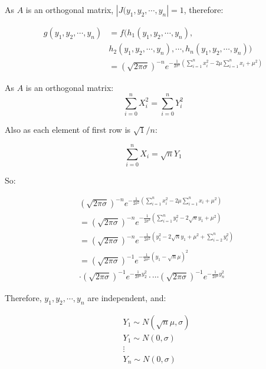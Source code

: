 \documentclass{article}
\begin{document}
As \(A\) is an orthogonal matrix, \(|J(y_1,y_2,\cdots,y_n|=1\), therefore:

\begin{equation}
\begin{split}
g(y_1,y_2,\cdots,y_n)&=f(h_1(y_1,y_2,\cdots,y_n),\\
    &h_2(y_1,y_2,\cdots,y_n),\cdots,h_n(y_1,y_2,\cdots,y_n))\\
    &=(\sqrt{2\pi\sigma})^{-n}e^{-\frac{1}{2\sigma^2}(\sum_
    {i=1}^nx_i^2-2\mu\sum_{i=1}^nx_i+\mu^2)}
\end{split}
\end{equation}

As \(A\) is an orthogonal matrix:
\begin{equation}
    \sum_{i=0}^nX_i^2=\sum_{i=0}^nY_i^2
\end{equation}

Also as each element of first row is \(\sqrt{1}/{n}\):

\begin{equation}
    \sum_{i=0}^nX_i = \sqrt{n}{Y_1}
\end{equation}

So:

\begin{equation}
    \begin{split}
    &(\sqrt{2\pi\sigma})^{-n}e^{-\frac{1}{2\sigma^2}(\sum_
        {i=1}^nx_i^2-2\mu\sum_{i=1}^nx_i+\mu^2)}\\
    &=(\sqrt{2\pi\sigma})^{-n}e^{-\frac{1}{2\sigma^2}(
        \sum_{i=1}^ny_i^2-2\sqrt{n}y_1+\mu^2)}\\
    &=(\sqrt{2\pi\sigma})^{-n}e^{-\frac{1}{2\sigma^2}
    (y_1^2-2\sqrt{n}y_1+\mu^2+\sum_{i=2}^ny_i^2)}\\
    &=(\sqrt{2\pi\sigma})^{-1}e^{-\frac{1}{2\sigma^2}(y_1-\sqrt{n}\mu)^2}\\
    &\cdot(\sqrt{2\pi\sigma})^{-1}e^{-\frac{1}{2\sigma^2}y_2^2}\cdot
    \cdots(\sqrt{2\pi\sigma})^{-1}e^{-\frac{1}{2\sigma^2}y_n^2}
    \end{split}
\end{equation}

Therefore, \(y_1,y_2,\cdots,y_n\) are independent, and:

\begin{equation}
    \begin{split}
   &Y_1\sim N(\sqrt{n}\mu, \sigma) \\
   &Y_1\sim N(0, \sigma) \\
   &\vdots \\
   &Y_n\sim N(0, \sigma) \\
    \end{split}
\end{equation}
\end{document}
